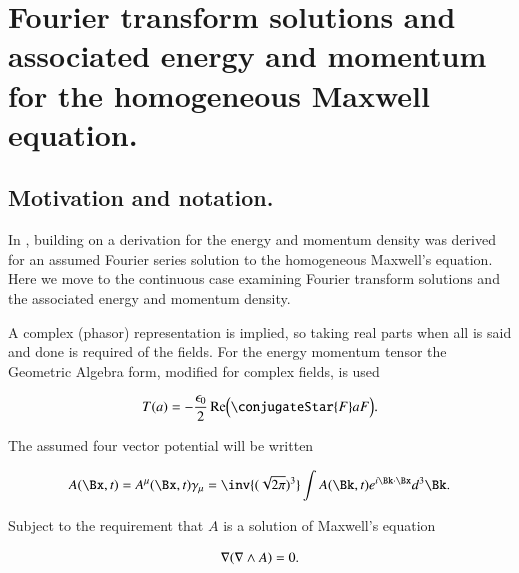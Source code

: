 %

%

\chapter{Fourier transform solutions and associated energy and momentum for the homogeneous Maxwell equation.}
\label{chap:ftMaxVacuum}
\date{Dec 21, 2009}

\beginArtNoToc

\section{Motivation and notation.}

In , building on  a derivation for the energy and momentum density was derived for an assumed Fourier series solution to the homogeneous Maxwell's equation.  Here we move to the continuous case examining Fourier transform solutions and the associated energy and momentum density.

A complex (phasor) representation is implied, so taking real parts when all is said and done is required of the fields.  For the energy momentum tensor the Geometric Algebra form, modified for complex fields, is used

\begin{align}
\label{eqn:ftMaxVacuum:1}
T(a) = -\frac{\epsilon_0}{2} \Real \Bigl( \conjugateStar{F} a F \Bigr).
\end{align}

The assumed four vector potential will be written

\begin{align}
\label{eqn:ftMaxVacuum:2}
A(\Bx, t) = A^\mu(\Bx, t) \gamma_\mu = \inv{(\sqrt{2 \pi})^3} \int A(\Bk, t) e^{i \Bk \cdot \Bx } d^3 \Bk.
\end{align}

Subject to the requirement that $A$ is a solution of Maxwell's equation

\begin{align}
\label{eqn:ftMaxVacuum:3}
\nabla (\nabla \wedge A) = 0.
\end{align}

